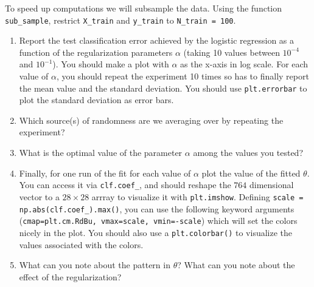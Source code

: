 \documentclass{article}
\begin{document}
To speed up computations we will subsample the data. Using the function \texttt{sub\_sample}, restrict \texttt{X\_train} and \texttt{y\_train} to \texttt{N\_train = 100}. 

\begin{enumerate}
\setcounter{enumi}{\value{saveenum}}
  \item Report the test classification error achieved by the logistic regression as a function of the regularization parameters $\alpha$ (taking 10 values between $10^{-4}$ and $10^{-1}$). You should make a plot with $\alpha$ as the x-axis in log scale. For each value of $\alpha$, you should repeat the experiment 10 times so has to finally report the mean value and the standard deviation. You should use \texttt{plt.errorbar} to plot the standard deviation as error bars.
  
  \item Which source(s) of randomness are we averaging over by repeating the experiment?

  
  \item What is the optimal value of the parameter $\alpha$ among the values you tested? 

  \item Finally, for one run of the fit for each value of $\alpha$ plot the value of the fitted $\theta$. You can access it via \texttt{clf.coef\_}, and should reshape the $764$ dimensional vector to a $28\times 28$ arrray to visualize it with \texttt{plt.imshow}. Defining \texttt{scale = np.abs(clf.coef\_).max()}, you can use the following keyword arguments (\texttt{cmap=plt.cm.RdBu, vmax=scale, vmin=-scale}) which will set the colors nicely in the plot. You should also use a \texttt{plt.colorbar()} to visualize the values associated with the colors.
  
  \item What can you note about the pattern in $\theta$? What can you note about the effect of the regularization?

  
\setcounter{saveenum}{\value{enumi}}
\end{enumerate}
\end{document}
